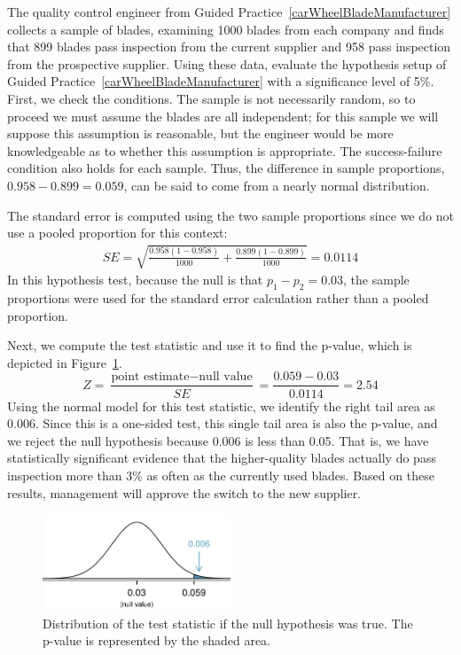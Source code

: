 \begin{example}{The quality control engineer from Guided Practice~\ref{carWheelBladeManufacturer} collects a sample of blades, examining 1000 blades from each company and finds that 899 blades pass inspection from the current supplier and 958 pass inspection from the prospective supplier. Using these data, evaluate the hypothesis setup of Guided Practice~\ref{carWheelBladeManufacturer} with a significance level of 5\%.}\label{qualityCtrlEngHypothesisEval}
First, we check the conditions. The sample is not necessarily random, so to proceed we must assume the blades are all independent; for this sample we will suppose this assumption is reasonable, but the engineer would be more knowledgeable as to whether this assumption is appropriate. The success-failure condition also holds for each sample. Thus, the difference in sample proportions, $0.958 - 0.899 = 0.059$, can be said to come from a nearly normal distribution.

The standard error is computed using the two sample proportions since we do not use a pooled proportion for this context:
\begin{align*}
SE = \sqrt{\frac{0.958(1-0.958)}{1000} + \frac{0.899(1-0.899)}{1000}} = 0.0114
\end{align*}
In this hypothesis test, because the null is that $p_1 - p_2 = 0.03$, the sample proportions were used for the standard error calculation rather than a pooled proportion.

Next, we compute the test statistic and use it to find the p-value, which is depicted in Figure~\ref{bladesTwoSampleHTPValueQC}.
$$Z = \frac{\text{point estimate} - \text{null value}}{SE} = \frac{0.059 - 0.03}{0.0114} = 2.54$$
Using the normal model for this test statistic, we identify the right tail area as 0.006. Since this is a one-sided test, this single tail area is also the p-value, and we reject the null hypothesis because 0.006 is less than 0.05. That is, we have statistically significant evidence that the higher-quality blades actually do pass inspection more than 3\% as often as the currently used blades. Based on these results, management will approve the switch to the new supplier.
\end{example}

\begin{figure}
\centering
\includegraphics[width=0.5\textwidth]{ch_inference_for_props/figures/bladesTwoSampleHTPValueQC/bladesTwoSampleHTPValueQC}
\caption{Distribution of the test statistic if the null hypothesis was true. The p-value is represented by the shaded area.}
\label{bladesTwoSampleHTPValueQC}
\end{figure}



